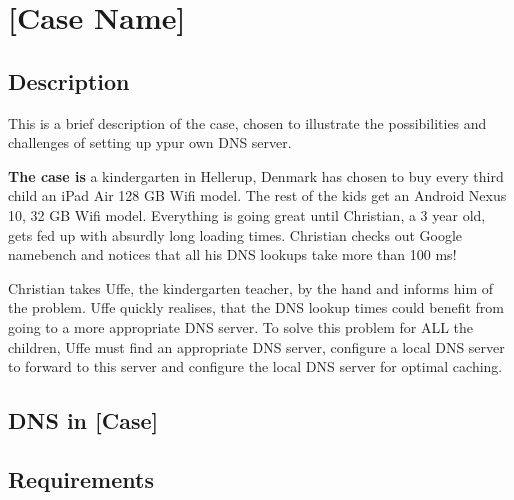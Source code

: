 \chapter{[Case Name]}
\section{Description}
This is a brief description of the case, chosen to illustrate the possibilities and challenges of setting up ypur own DNS server.

\textbf{The case is}
a kindergarten in Hellerup, Denmark has chosen to buy every third child an iPad Air 128 GB Wifi model. The rest of the kids get an Android Nexus 10, 32 GB Wifi model. Everything is going great until Christian, a 3 year old, gets fed up with absurdly long loading times. Christian checks out Google namebench and notices that all his DNS lookups take more than 100 ms!

Christian takes Uffe, the kindergarten teacher, by the hand and informs him of the problem. Uffe quickly realises, that the DNS lookup times could benefit from going to a more appropriate DNS server. To solve this problem for ALL the children, Uffe must find an appropriate DNS server, configure a local DNS server to forward to this server and configure the local DNS server for optimal caching.

\section{DNS in [Case]}

\section{Requirements}

